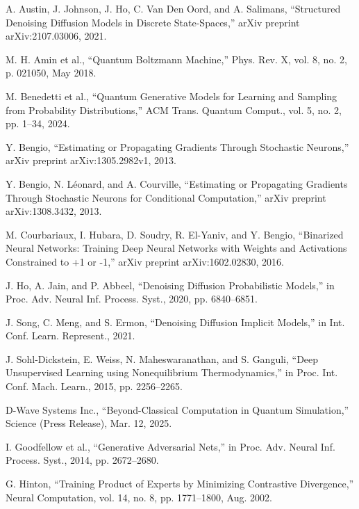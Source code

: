 \documentclass[10pt,twocolumn,letterpaper]{article}
\begin{document}
{\small

\begin{thebibliography}{00}

 A. Austin, J. Johnson, J. Ho, C. Van Den Oord, and A. Salimans, ``Structured Denoising Diffusion Models in Discrete State-Spaces,'' arXiv preprint arXiv:2107.03006, 2021.

 M. H. Amin et al., ``Quantum Boltzmann Machine,'' Phys. Rev. X, vol. 8, no. 2, p. 021050, May 2018.

 M. Benedetti et al., ``Quantum Generative Models for Learning and Sampling from Probability Distributions,'' ACM Trans. Quantum Comput., vol. 5, no. 2, pp. 1–34, 2024.

 Y. Bengio, ``Estimating or Propagating Gradients Through Stochastic Neurons,'' arXiv preprint arXiv:1305.2982v1, 2013.

 Y. Bengio, N. Léonard, and A. Courville, ``Estimating or Propagating Gradients Through Stochastic Neurons for Conditional Computation,'' arXiv preprint arXiv:1308.3432, 2013.

 M. Courbariaux, I. Hubara, D. Soudry, R. El-Yaniv, and Y. Bengio, ``Binarized Neural Networks: Training Deep Neural Networks with Weights and Activations Constrained to +1 or -1,'' arXiv preprint arXiv:1602.02830, 2016.

 J. Ho, A. Jain, and P. Abbeel, ``Denoising Diffusion Probabilistic Models,'' in Proc. Adv. Neural Inf. Process. Syst., 2020, pp. 6840–6851.

 J. Song, C. Meng, and S. Ermon, ``Denoising Diffusion Implicit Models,'' in Int. Conf. Learn. Represent., 2021.

 J. Sohl-Dickstein, E. Weiss, N. Maheswaranathan, and S. Ganguli, ``Deep Unsupervised Learning using Nonequilibrium Thermodynamics,'' in Proc. Int. Conf. Mach. Learn., 2015, pp. 2256–2265.

 D-Wave Systems Inc., ``Beyond-Classical Computation in Quantum Simulation,'' Science (Press Release), Mar. 12, 2025.

 I. Goodfellow et al., ``Generative Adversarial Nets,'' in Proc. Adv. Neural Inf. Process. Syst., 2014, pp. 2672–2680.

 G. Hinton, ``Training Product of Experts by Minimizing Contrastive Divergence,'' Neural Computation, vol. 14, no. 8, pp. 1771–1800, Aug. 2002.


\end{thebibliography}}
\end{document}
